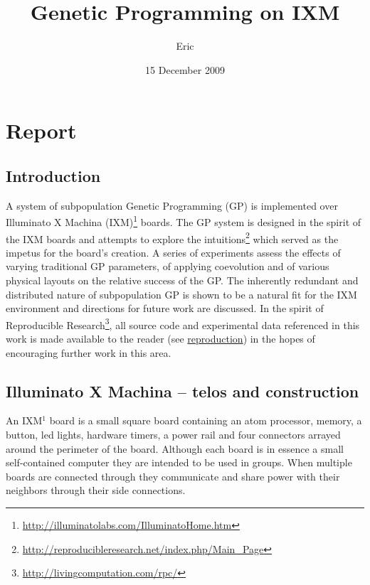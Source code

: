 \documentclass[11pt]{article}
\title{Genetic Programming on IXM}
\author{Eric}
\date{15 December 2009}
\begin{document}
\maketitle


\section*{Report}
\label{sec-1}

\subsection*{Introduction}
\label{sec-1.1}

A system of subpopulation Genetic Programming (GP) is implemented over
Illuminato X Machina (IXM)\footnote{\href{http://illuminatolabs.com/IlluminatoHome.htm}{http://illuminatolabs.com/IlluminatoHome.htm} } boards.  The GP system is designed in
the spirit of the IXM boards and attempts to explore the
intuitions\footnote{\href{http://reproducibleresearch.net/index.php/Main_Page}{http://reproducibleresearch.net/index.php/Main\_Page} } which served as the impetus for the board's creation.
A series of experiments assess the effects of varying traditional GP
parameters, of applying coevolution and of various physical layouts on
the relative success of the GP.  The inherently redundant and
distributed nature of subpopulation GP is shown to be a natural fit
for the IXM environment and directions for future work are discussed.
In the spirit of Reproducible Research\footnote{\href{http://livingcomputation.com/rpc/}{http://livingcomputation.com/rpc/} }, all source code and
experimental data referenced in this work is made available to the
reader (see \hyperref[sec-1.7]{reproduction}) in the hopes of encouraging further work in
this area.

\subsection*{Illuminato X Machina -- telos and construction}
\label{sec-1.2}

An IXM$^{1}$ board is a small square board containing an atom
processor, memory, a button, led lights, hardware timers, a power rail
and four connectors arrayed around the perimeter of the board.
Although each board is in essence a small self-contained computer they
are intended to be used in groups.  When multiple boards are connected
through they communicate and share power with their neighbors through
their side connections.
\end{document}
